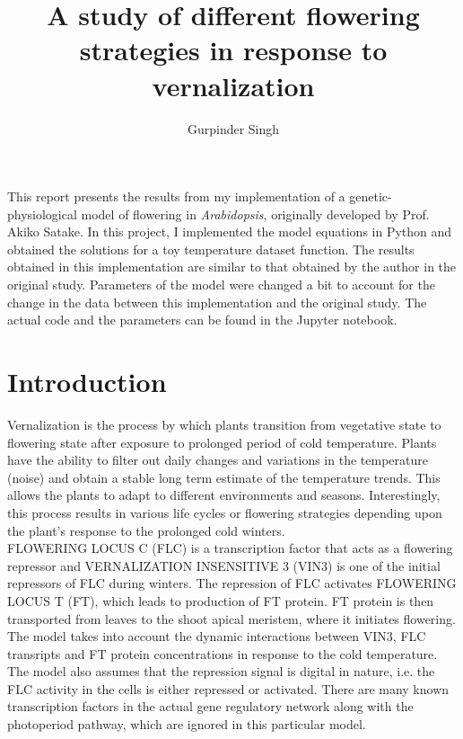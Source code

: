\documentclass[10 pt]{article}
\title{A study of different flowering strategies in response to vernalization}
\author{Gurpinder Singh}
\date{}
\begin{document}
\maketitle

This report presents the results from my implementation of a genetic-physiological model of flowering in \textit{Arabidopsis}, originally developed by Prof. Akiko Satake. In this project, I implemented the model equations in Python and obtained the solutions for a toy temperature dataset function. The results obtained in this implementation are similar to that obtained by the author in the original study. Parameters of the model were changed a bit to account for the change in the data between this implementation and the original study. The actual code and the parameters can be found in the Jupyter notebook.     

\section{Introduction}

Vernalization is the process by which plants transition from vegetative state to flowering state after exposure to prolonged period of cold temperature. Plants have the ability to filter out daily changes and variations in the temperature (noise) and obtain a stable long term estimate of the temperature trends. This allows the plants to adapt to different environments and seasons. Interestingly, this process results in various life cycles or flowering strategies depending upon the plant's response to the prolonged cold winters. \\

FLOWERING LOCUS C (FLC) is a transcription factor that acts as a flowering repressor and VERNALIZATION INSENSITIVE 3 (VIN3) is one of the initial repressors of FLC during winters. The repression of FLC activates FLOWERING LOCUS T (FT), which leads to production of FT protein. FT protein is then transported from leaves to the shoot apical meristem, where it initiates flowering. \\

The model takes into account the dynamic interactions between VIN3, FLC transripts and FT protein concentrations in response to the cold temperature. The model also assumes that the repression signal is digital in nature, i.e. the FLC activity in the cells is either repressed or activated. There are many known transcription factors in the actual gene regulatory network along with the photoperiod pathway, which are ignored in this particular model.  
\end{document}
